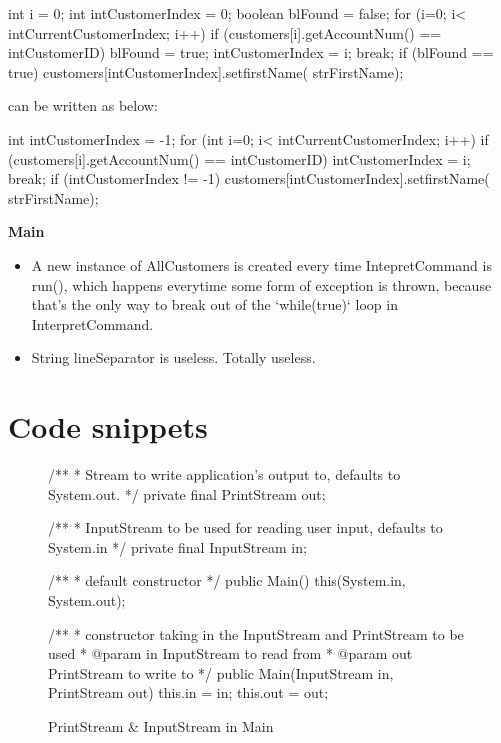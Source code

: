 \begin{javacode}
int i = 0;
int intCustomerIndex = 0;
boolean blFound = false;
for (i=0; i< intCurrentCustomerIndex; i++) {
    if (customers[i].getAccountNum() == intCustomerID) {
        blFound = true;
        intCustomerIndex = i;
        break;
    }
}
if (blFound == true) {
    customers[intCustomerIndex].setfirstName( strFirstName);
}
\end{javacode}
can be written as below: 
\begin{javacode}
int intCustomerIndex = -1;
for (int i=0; i< intCurrentCustomerIndex; i++) {
    if (customers[i].getAccountNum() == intCustomerID) {
        intCustomerIndex = i;
        break;
    }
}
if (intCustomerIndex != -1) {
    customers[intCustomerIndex].setfirstName( strFirstName);
}
\end{javacode}

\textbf{Main}
\begin{itemize}
    \item A new instance of AllCustomers is created every time IntepretCommand is run(), which happens everytime some form of exception is thrown, because that's the only way to break out of the `while(true)` loop in InterpretCommand. 
    \item String lineSeparator is useless. Totally useless.
\end{itemize}

\pagebreak
\section{Code snippets}
\label{app:code-snippets}

\begin{figure}[H]
\centering
\begin{javacode}
/**
 * Stream to write application's output to, defaults to System.out.
 */
private final PrintStream out;

/**
 * InputStream to be used for reading user input, defaults to System.in
 */
private final InputStream in;

/**
 * default constructor
 */
public Main() {
    this(System.in, System.out);
}

/**
 * constructor taking in the InputStream and PrintStream to be used
 * @param in InputStream to read from
 * @param out PrintStream to write to
 */
public Main(InputStream in, PrintStream out) {
    this.in = in;
    this.out = out;
}
\end{javacode}
\caption{PrintStream \& InputStream in Main}
\label{code:snippet-1}
\end{figure}
